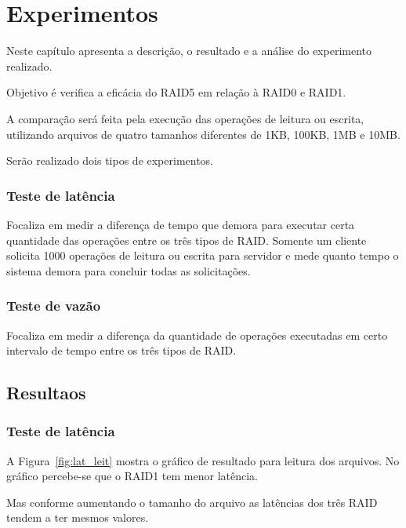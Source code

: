 	\section{Experimentos}
	Neste capítulo apresenta a descrição, o resultado e a análise do experimento realizado.
	
	Objetivo é verifica a eficácia do RAID5 em relação à RAID0 e RAID1.
	
	A comparação será feita pela execução das operações de leitura ou escrita, utilizando arquivos de quatro tamanhos diferentes de 1KB, 100KB, 1MB e 10MB.
	
	Serão realizado dois tipos de experimentos.
	\subsubsection{Teste de latência}
	Focaliza em medir a diferença de tempo que demora para executar certa quantidade das operações entre os três tipos de RAID.
	Somente um cliente solicita 1000 operações de leitura ou escrita para servidor e mede quanto tempo o sistema demora para concluir todas as solicitações.
	
	\subsubsection{Teste de vazão}	
	Focaliza em medir a diferença da quantidade de operações executadas em certo intervalo de tempo entre os três tipos de RAID.
	
	\subsection{Resultaos}
	
	\subsubsection{Teste de latência}
	
	A Figura~\ref{fig:lat_leit} mostra o gráfico de resultado para leitura dos arquivos. 
	No gráfico percebe-se que o RAID1 tem menor latência.
	
	Mas conforme aumentando o tamanho do arquivo as latências dos três RAID tendem a ter mesmos valores.
	
	
	
